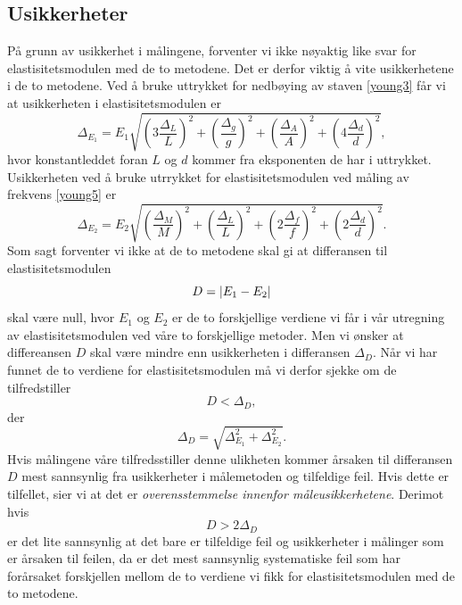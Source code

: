 \documentclass[%
 reprint,
 amsmath,amssymb,
 aps,
 norsk,
 booktabs
]{revtex4-1}
\begin{document}
\subsection{Usikkerheter}
På grunn av usikkerhet i målingene, forventer vi ikke nøyaktig like svar for elastisitetsmodulen med de to metodene. Det er derfor viktig å vite usikkerhetene i de to metodene. Ved å bruke uttrykket for nedbøying av staven \eqref{young3} får vi at usikkerheten i elastisitetsmodulen er
\begingroup\makeatletter\def\f@size{7.5}\check@mathfonts
\begin{equation}
  \Delta_{E_1} = E_1 \sqrt{\left(3\frac{\Delta_L}{L}\right)^2+\left(\frac{\Delta_g}{g}\right)^2+\left(\frac{\Delta_A}{A}\right)^2+\left(4\frac{\Delta_d}{d}\right)^2},\label{uncertenty1}
\end{equation}
\endgroup
hvor konstantleddet foran $L$ og $d$ kommer fra eksponenten de har i uttrykket.
Usikkerheten ved å bruke utrrykket for elastisitetsmodulen ved måling av frekvens \eqref{young5} er
\begingroup\makeatletter\def\f@size{7.5}\check@mathfonts
\begin{equation}
  \Delta_{E_2} = E_2 \sqrt{\left(\frac{\Delta_M}{M}\right)^2+\left(\frac{\Delta_L}{L}\right)^2+\left(2\frac{\Delta_f}{f}\right)^2+\left(2\frac{\Delta_d}{d}\right)^2}. \label{uncertenty2}
\end{equation}
\endgroup
Som sagt forventer vi ikke at de to metodene skal gi at differansen til elastisitetsmodulen $$D=\abs{E_1-E_2}$$ skal være null, hvor $E_1$ og $E_2$ er de to forskjellige verdiene vi får i vår utregning av elastisitetsmodulen ved våre to forskjellige metoder. Men vi ønsker at differeansen $D$ skal være mindre enn usikkerheten i differansen $\Delta_D$. Når vi har funnet de to verdiene for elastisitetsmodulen må vi derfor sjekke om de tilfredstiller
\begin{equation}
  D < \Delta_D, \label{usikk1}
\end{equation}
der
\begin{equation}
  \Delta_D = \sqrt{\Delta_{E_1}^2 + \Delta_{E_2}^2}. \label{usikk2}
\end{equation}
Hvis målingene våre tilfredsstiller denne ulikheten kommer årsaken til differansen $D$ mest sannsynlig fra usikkerheter i målemetoden og tilfeldige feil. Hvis dette er tilfellet, sier vi at det er
\textit{overensstemmelse innenfor måleusikkerhetene}.
Derimot hvis
\begin{equation}
  D > 2\Delta_D
\end{equation}
er det lite sannsynlig at det bare er tilfeldige feil og usikkerheter i målinger som er årsaken til feilen, da er det mest sannsynlig systematiske feil som har forårsaket forskjellen mellom de to verdiene vi fikk for elastisitetsmodulen med de to metodene.
\end{document}
